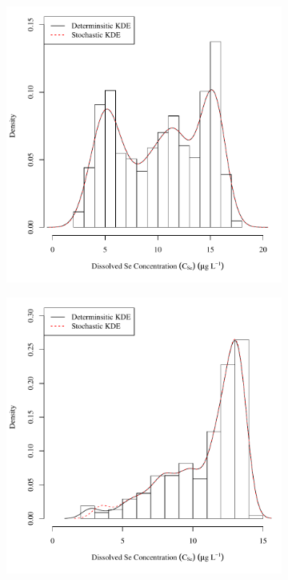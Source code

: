 \subfiguretop
\begin{landscape}
	\begin{figure}
		\begin{subfigure}{0.7\textwidth}
			\centering
			\includegraphics[width=\tableCustomSize]{"Figures/Results_USR/Stochastic/c d&s est U163"}
		\end{subfigure}%
		\begin{subfigure}{0.7\textwidth}
			\centering
			\includegraphics[width=\tableCustomSize]{"Figures/Results_USR/Stochastic/c d&s est U201"}

\end{subfigure}
\end{figure}
\end{landscape}
